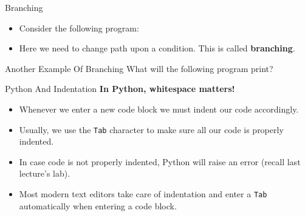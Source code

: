 \documentclass[aspectratio=169, 12pt, xcolor=table]{beamer}
\begin{document}
	\begin{frame}{Branching}
		\begin{minipage}{0.6\textwidth}
			\vspace{0pt}
			\begin{itemize}
				\item Consider the following program:
				
				\item Here we need to change path upon a condition. This is called \textbf{branching}.
			\end{itemize}
		\end{minipage}\hfill
		\begin{minipage}{0.38\textwidth}
			\vspace{0pt}
			\begin{center}
			\end{center}
		\end{minipage}
	\end{frame}

	\begin{frame}{Another Example Of Branching}
		What will the following program print?
		
	\end{frame}

	\begin{headsup}{Python And Indentation}
		\textbf{In Python, whitespace matters!}
		\begin{itemize}
			\item Whenever we enter a new code block we must indent our code accordingly.
			\item Usually, we use the \texttt{Tab} character to make sure all our code is properly indented.
			\item In case code is not properly indented, Python will raise an error (recall last lecture's lab).
			\item Most modern text editors take care of indentation and enter a \texttt{Tab} automatically when entering a code block.
		\end{itemize}
	\end{headsup}
\end{document}

